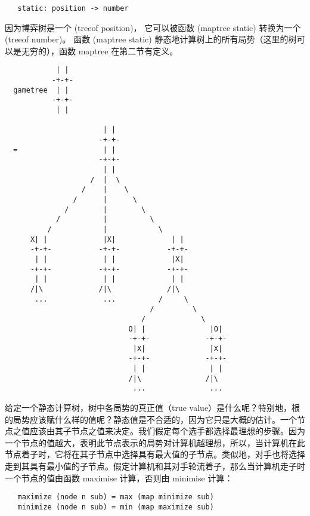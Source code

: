 \documentclass[12pt,a4paper]{article}
\begin{document}
\begin{verbatim}
   static: position -> number
\end{verbatim}

因为博弈树是一个 (treeof position)， 它可以被函数 (maptree static) 转换为一个 (treeof number)。 函数 (maptree static) 静态地计算树上的所有局势（这里的树可以是无穷的），函数 maptree 在第二节有定义。

\clearpage
\begin{verbatim}
            | |
           -+-+-
  gametree  | |
           -+-+-
            | |

                       | |
                      -+-+-
  =                    | |
                      -+-+-
                       | |
                    /  |  \
                  /    |    \
                /      |      \
              /        |        \
            /          |          \
          /            |            \
      X| |             |X|             | |
      -+-+-           -+-+-           -+-+-
       | |             | |             |X|
      -+-+-           -+-+-           -+-+-
       | |             | |             | |
      /|\             /|\             /|\
       ...             ...          /     \
                                  /         \
                                /             \
                             O| |               |O|
                             -+-+-             -+-+-
                              |X|               |X|
                             -+-+-             -+-+-
                              | |               | |
                             /|\               /|\
                              ...               ...

\end{verbatim}
 
给定一个静态计算树，树中各局势的真正值（true value）是什么呢？特别地，根的局势应该赋什么样的值呢？静态值是不合适的，因为它只是大概的估计。一个节点之值应该由其子节点之值来决定。我们假定每个选手都选择最理想的步骤。因为一个节点的值越大，表明此节点表示的局势对计算机越理想，所以，当计算机在此节点着子时，它将在其子节点中选择具有最大值的子节点。类似地，对手也将选择走到其具有最小值的子节点。假定计算机和其对手轮流着子，那么当计算机走子时一个节点的值由函数 maximise 计算，否则由 minimise 计算：

\begin{verbatim}
   maximize (node n sub) = max (map minimize sub)
   minimize (node n sub) = min (map maximize sub)
\end{verbatim}
\end{document}
